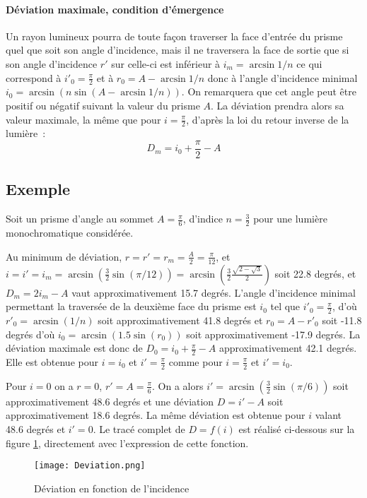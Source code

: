 \paragraph{Déviation maximale, condition d'émergence}

Un rayon lumineux pou\-rra de toute façon traverser la face d'entrée du prisme quel que soit son angle d'incidence, mais il ne traversera la face de sortie que si son angle d'incidence \(r'\) sur celle-ci est inférieur à \(i_m = \arcsin 1/n\) ce qui correspond à \(i'_0 = \frac{\pi}{2}\) et à \(r_0 = A - \arcsin 1/n\) donc à l'angle d'incidence minimal \(i_0 = \arcsin(n\sin(A-\arcsin 1/n))\). On remarquera que cet angle peut être positif ou négatif suivant la valeur du prisme \(A\). La déviation prendra alors sa valeur maximale, la même que pour \(i=\frac{\pi}{2}\), d'après la loi du retour inverse de la lumière~:\begin{equation}
	D_m = i_0 +\frac{\pi}{2} - A
\end{equation}

\subsection{Exemple}
\label{chap6-subsec:exemple}
Soit un prisme d'angle au sommet \(A = \frac{\pi}{6}\), d'indice \(n=\frac{3}{2}\) pour une lumière monochromatique considérée.

Au minimum de déviation, \(r=r'=r_m=\frac{A}{2}=\frac{\pi}{12}\), et \(i=i'=i_m=\arcsin\left(\frac{3}{2}\sin(\pi/12)\right) = \arcsin\left(\frac{3}{2} \frac{\sqrt{2-\sqrt{3}}}{2}\right)\) soit 22.8 degrés, et \(D_m=2i_m-A\) vaut approximativement 15.7 degrés.
L'angle d'incidence minimal permettant la traversée de la deuxième face du prisme est \(i_0\) tel que \(i'_0=\frac{\pi}{2}\), d'où \(r'_0 = \arcsin(1/n)\) soit approximativement 41.8 degrés et \(r_0=A-r'_0\) soit -11.8 degrés d'où \(i_0=\arcsin(1.5 \sin(r_0))\) soit approximativement -17.9 degrés. La déviation maximale est donc de \(D_0 = i_0 + \frac{\pi}{2}-A\) approximativement 42.1 degrés. Elle est obtenue pour \(i=i_0\) et \(i'=\frac{\pi}{2}\) comme pour \(i=\frac{\pi}{2}\) et \(i'=i_0\).

Pour \(i=0\) on a \(r=0\), \(r'=A=\frac{\pi}{6}\). On a alors \(i'=\arcsin(\frac{3}{2}\sin(\pi/6))\) soit approximativement 48.6 degrés et une déviation \(D=i'-A\) soit approximativement 18.6 degrés. La même déviation est obtenue pour \(i\) valant 48.6 degrés et \(i'=0\).
Le tracé complet de \(D=f(i)\) est réalisé ci-dessous sur la figure \ref{fig:chap6-deviation}, directement avec l'expression de cette fonction.
\begin{figure}
	\centering
	\texttt{[image: Deviation.png]}
	\caption{Déviation en fonction de l'incidence}
	\label{fig:chap6-deviation}
\end{figure}
